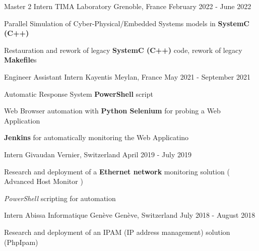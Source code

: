 \begin{cventries}
	\cventry
	{Master 2 Intern} %
	{TIMA Laboratory} %
	{Grenoble, France} %
	{February 2022 - June 2022} %
	{
		\begin{cvitems} %
		\item{Parallel Simulation of Cyber-Physical/Embedded Systems models in \textbf{SystemC (C++)}}
		\item {Restauration and rework of legacy \textbf{SystemC (C++)} code, rework of legacy \textbf{Makefile}s}		
		\end{cvitems}
	}

	\cventry
	{Engineer Assistant Intern} %
	{Kayentis} %
	{Meylan, France} %
	{May 2021 - September 2021} %
	{
		\begin{cvitems} %
		\item {Automatic Response System \textbf{PowerShell} script}
		\item {Web Browser automation with \textbf{Python Selenium} for probing a Web Application}
		\item {\textbf{Jenkins} for automatically monitoring the Web Applicatino}
		\end{cvitems}
	}

	\cventry
	{Intern} %
	{Givaudan} %
	{Vernier, Switzerland} %
	{April 2019 - July 2019} %
	{
		\begin{cvitems} %
		\item {Research and deployment of a \textbf{Ethernet network} monitoring solution ( Advanced Host Monitor )}
		\item {\emph{PowerShell} scripting for automation}
		\end{cvitems}
	}

	\cventry
	{Intern} %
	{Abissa Informatique Genève} %
	{Genève, Switzerland} %
	{July 2018 - August 2018} %
	{
		\begin{cvitems} %
		\item {Research and deployment of an IPAM (IP address management) solution (PhpIpam)}
		\end{cvitems}
	}
\end{cventries}
